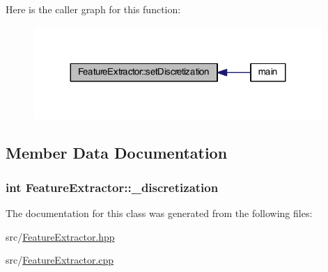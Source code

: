 Here is the caller graph for this function\+:
\nopagebreak
\begin{figure}[H]
\begin{center}
\leavevmode
\includegraphics[width=311pt]{class_feature_extractor_a99ef3afd19f932dcb7dbb089e474d41b_icgraph}
\end{center}
\end{figure}




\subsection{Member Data Documentation}
\hypertarget{class_feature_extractor_a76b9438b85a119c2ec4126b75c0486bf}{
\subsubsection[{\+\_\+discretization}]{\setlength{\rightskip}{0pt plus 5cm}int Feature\+Extractor\+::\+\_\+discretization\hspace{0.3cm}{\ttfamily [private]}}}\label{class_feature_extractor_a76b9438b85a119c2ec4126b75c0486bf}


The documentation for this class was generated from the following files\+:\begin{DoxyCompactItemize}
\item 
src/\hyperlink{_feature_extractor_8hpp}{Feature\+Extractor.\+hpp}\item 
src/\hyperlink{_feature_extractor_8cpp}{Feature\+Extractor.\+cpp}\end{DoxyCompactItemize}
